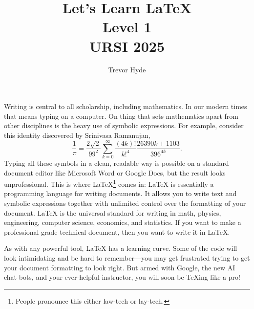 \documentclass[11pt]{article}
\title{Let's Learn \LaTeX\\ 
Level 1\\
URSI 2025}
\author{Trevor Hyde}
\date{}
\begin{document}
\maketitle

Writing is central to all scholarship, including mathematics.
In our modern times that means typing on a computer.
On thing that sets mathematics apart from other disciplines is the heavy use of symbolic expressions.
For example, consider this identity discovered by Srinivasa Ramanujan,
\[
    \frac{1}{\pi} = \frac{2\sqrt{2}}{99^2}\sum_{k=0}^\infty \frac{(4k)!}{k!^4}\frac{26390k + 1103}{396^{4k}}.
\]
Typing all these symbols in a clean, readable way is possible on a standard document editor like Microsoft Word or Google Docs, but the result looks unprofessional.
This is where LaTeX\footnote{People pronounce this either law-tech or lay-tech.} comes in: LaTeX is essentially a programming language for writing documents.
It allows you to write text and symbolic expressions together with unlimited control over the formatting of your document.
LaTeX is the universal standard for writing in math, physics, engineering, computer science, economics, and statistics.
If you want to make a professional grade technical document, then you want to write it in LaTeX.









As         with any powerful tool, LaTeX has a learning curve.
Some of the code will look intimidating and be hard to remember---you  may get frustrated trying to get your document formatting to look right.
But armed with Google, the new AI chat bots, and your ever-helpful instructor, you will soon be TeXing like a pro!
\end{document}
